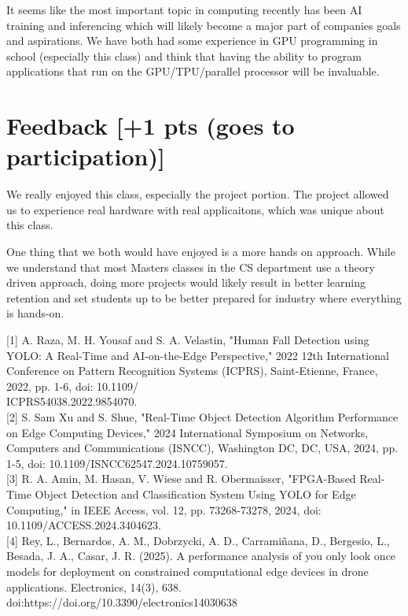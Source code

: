 \documentclass[sigconf,authorversion,nonacm]{acmart}
\begin{document}
It seems like the most important topic in computing recently has been AI training and inferencing which will likely become a major part of companies goals and aspirations. We have both had some experience in GPU programming in school (especially this class) and think that having the ability to program applications that run on the GPU/TPU/parallel processor will be invaluable. 


\section{Feedback {\small {[+1 pts (goes to participation)]}}}  

We really enjoyed this class, especially the project portion. The project allowed us to experience real hardware with real applicaitons, which was unique about this class.

One thing that we both would have enjoyed is a more hands on approach. While we understand that most Masters classes in the CS department use a theory driven approach, doing more projects would likely result in better learning retention and set students up to be better prepared for industry where everything is hands-on.

\clearpage




[1] A. Raza, M. H. Yousaf and S. A. Velastin, "Human Fall Detection using YOLO: A Real-Time and AI-on-the-Edge Perspective," 2022 12th International Conference on Pattern Recognition Systems (ICPRS), Saint-Etienne, France, 2022, pp. 1-6, doi: 10.1109/\\ICPRS54038.2022.9854070.\\

[2] S. Sam Xu and S. Shue, "Real-Time Object Detection Algorithm Performance on Edge Computing Devices," 2024 International Symposium on Networks, Computers and Communications (ISNCC), Washington DC, DC, USA, 2024, pp. 1-5, doi: 10.1109/ISNCC62547.2024.10759057. \\

[3] R. A. Amin, M. Hasan, V. Wiese and R. Obermaisser, "FPGA-Based Real-Time Object Detection and Classification System Using YOLO for Edge Computing," in IEEE Access, vol. 12, pp. 73268-73278, 2024, doi: 10.1109/ACCESS.2024.3404623. \\

[4] Rey, L., Bernardos, A. M., Dobrzycki, A. D., Carramiñana, D., Bergesio, L., Besada, J. A., Casar, J. R. (2025). A performance analysis of you only look once models for deployment on constrained computational edge devices in drone applications. Electronics, 14(3), 638. doi:https://doi.org/10.3390/electronics14030638
\end{document}
